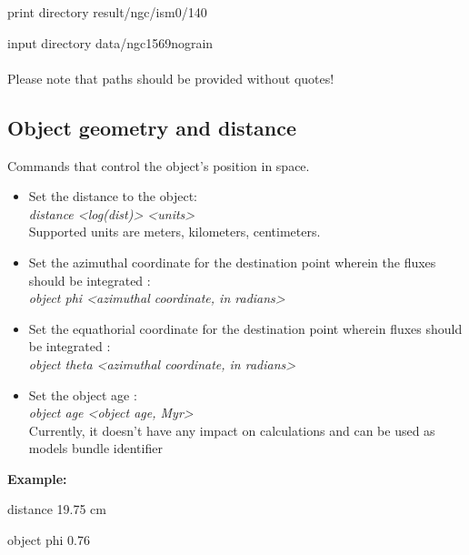 \documentclass[a4paper]{article}
\begin{document}
\hspace*{0.25cm} print directory result/ngc/ism0/140
\vspace{0.1cm}

\hspace*{0.25cm} input directory data/ngc1569nograin \\
\\
Please note that paths should be provided without quotes!\\

\subsection{Object geometry and distance}
Commands that control the object's position in space.
\begin{itemize}
    \item Set the distance to the object: \\
    \hspace*{0.25cm} {\it distance <log(dist)> <units>} \\
    Supported units are meters, kilometers, centimeters.
    \item Set the azimuthal coordinate for the destination point wherein the fluxes should be integrated : \\
    \hspace*{0.25cm} {\it object phi <azimuthal coordinate, in radians>}
    \item Set the equathorial coordinate for the destination point wherein fluxes should be integrated : \\
    \hspace*{0.25cm} {\it object theta <azimuthal coordinate, in radians>}
    \item Set the object age : \\
    \hspace*{0.25cm} {\it object age <object age, Myr>} \\
    Currently, it doesn't have any impact on calculations and can be used as models bundle identifier
\end{itemize}

{\bf Example:}
\vspace{0.25cm}

\hspace*{0.25cm} distance 19.75 cm
\vspace{0.1cm}

\hspace*{0.25cm} object phi 0.76
\vspace{0.1cm}
\end{document}
